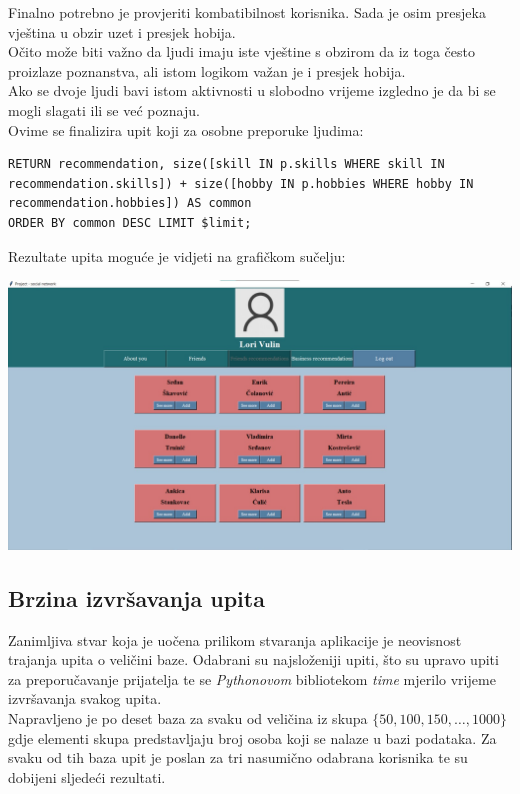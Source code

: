 \documentclass[titlepage, 12pt]{scrartcl}
\begin{document}
Finalno potrebno je provjeriti kombatibilnost korisnika. Sada je osim presjeka vještina u obzir uzet i presjek hobija. \\
Očito može biti važno da ljudi imaju iste vještine s obzirom da iz toga često proizlaze poznanstva, ali istom logikom važan je i presjek hobija. \\
Ako se dvoje ljudi bavi istom aktivnosti u slobodno vrijeme izgledno je da bi se mogli slagati ili se već poznaju. \\
Ovime se finalizira upit koji za osobne preporuke ljudima:
\begin{samepage}
\begin{verbatim}
RETURN recommendation, size([skill IN p.skills WHERE skill IN recommendation.skills]) + size([hobby IN p.hobbies WHERE hobby IN recommendation.hobbies]) AS common 
ORDER BY common DESC LIMIT $limit;

\end{verbatim}
\end{samepage}
\newpage
\begin{samepage}
Rezultate upita moguće je vidjeti na grafičkom sučelju:
\begin{center}
    \includegraphics[scale=0.19]{slike/personal.jpg}
\end{center}
\end{samepage}

\subsection{Brzina izvršavanja upita}
Zanimljiva stvar koja je uočena prilikom stvaranja aplikacije je neovisnost trajanja upita o veličini baze. Odabrani su najsloženiji upiti, što su upravo upiti za preporučavanje prijatelja te se \emph{Pythonovom} bibliotekom \emph{time} mjerilo vrijeme izvršavanja svakog upita. \\
Napravljeno je po deset baza za svaku od veličina iz skupa $\{50, 100, 150, \dots, 1000\}$ gdje elementi skupa predstavljaju broj osoba koji se nalaze u bazi podataka. Za svaku od tih baza upit je poslan za tri nasumično odabrana korisnika te su dobijeni sljedeći rezultati.\\
\end{document}
